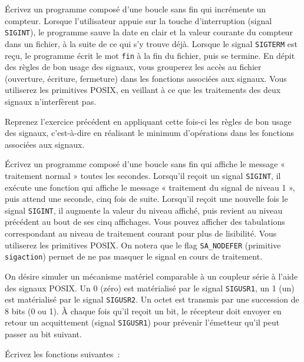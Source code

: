 \question

Écrivez un programme composé d'une boucle sans fin qui
incrémente un compteur. Lorsque l'utilisateur appuie sur la touche
d'interruption (signal {\tt SIGINT}), le programme sauve la date en
clair et la valeur courante du compteur dans un fichier,
à la suite de ce qui s'y trouve déjà.
Lorsque le signal {\tt SIGTERM} est reçu, le programme écrit
le mot {\tt fin} à la fin du fichier, puis se termine.
En dépit des règles de bon usage des signaux, vous grouperez les accès
au fichier (ouverture, écriture, fermeture) dans les fonctions associées
aux signaux.  Vous utiliserez les primitives POSIX, en veillant à ce
que les traitements des deux signaux n'interfèrent pas.

\clearpage


\question

Reprenez l'exercice précédent en appliquant cette fois-ci les règles
de bon usage des signaux, c'est-à-dire en réalisant le minimum
d'opérations dans les fonctions associées aux signaux.


\question

Écrivez un programme composé d'une boucle sans fin qui affiche le
message « traitement normal » toutes les secondes. Lorsqu'il reçoit un
signal {\tt SIGINT}, il exécute une fonction qui affiche le message
« traitement du signal de niveau 1 », puis attend une seconde, cinq
fois de suite. Lorsqu'il reçoit une nouvelle fois le signal \texttt
{SIGINT}, il augmente la valeur du niveau affiché, puis revient au
niveau précédent au bout de ses cinq affichages. Vous pouvez afficher
des tabulations correspondant au niveau de traitement courant pour plus
de lisibilité. Vous utiliserez les primitives POSIX. On notera que le
flag \texttt {SA\_NODEFER} (primitive \texttt {sigaction}) permet de ne
pas masquer le signal en cours de traitement.


\question

On désire simuler un mécanisme matériel comparable à un coupleur série
à l'aide des signaux POSIX. Un 0 (zéro) est matérialisé par le signal
{\tt SIGUSR1}, un 1 (un) est matérialisé par le signal {\tt SIGUSR2}.
Un octet est transmis par une succession de 8 bits (0 ou 1).
À chaque fois qu'il reçoit un bit, le récepteur doit envoyer en
retour un acquittement (signal {\tt SIGUSR1}) pour prévenir l'émetteur
qu'il peut passer au bit suivant.

Écrivez les fonctions suivantes~:

